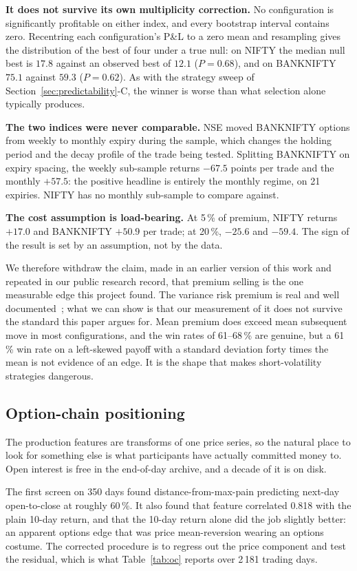 \documentclass[conference]{IEEEtran}
\begin{document}
\textbf{It does not survive its own multiplicity correction.} No configuration
is significantly profitable on either index, and every bootstrap interval
contains zero. Recentring each configuration's P\&L to a zero mean and
resampling gives the distribution of the best of four under a true null: on
NIFTY the median null best is $17.8$ against an observed best of $12.1$
($P = 0.68$), and on BANKNIFTY $75.1$ against $59.3$ ($P = 0.62$). As with the
strategy sweep of Section~\ref{sec:predictability}-C, the winner is worse than
what selection alone typically produces.

\textbf{The two indices were never comparable.} NSE moved BANKNIFTY options from
weekly to monthly expiry during the sample, which changes the holding period and
the decay profile of the trade being tested. Splitting BANKNIFTY on expiry
spacing, the weekly sub-sample returns $-67.5$ points per trade and the monthly
$+57.5$: the positive headline is entirely the monthly regime, on 21 expiries.
NIFTY has no monthly sub-sample to compare against.

\textbf{The cost assumption is load-bearing.} At 5\,\% of premium, NIFTY returns
$+17.0$ and BANKNIFTY $+50.9$ per trade; at 20\,\%, $-25.6$ and $-59.4$. The
sign of the result is set by an assumption, not by the data.

We therefore withdraw the claim, made in an earlier version of this work and
repeated in our public research record, that premium selling is the one
measurable edge this project found. The variance risk premium is real and
well documented~\cite{carr2009,bakshi2003}; what we can show is that our
measurement of it does not survive the standard this paper argues for. Mean
premium does exceed mean subsequent move in most configurations, and the win
rates of 61--68\,\% are genuine, but a 61\,\% win rate on a left-skewed payoff
with a standard deviation forty times the mean is not evidence of an edge. It is
the shape that makes short-volatility strategies dangerous.

\subsection{Option-chain positioning}

The production features are transforms of one price series, so the natural place
to look for something else is what participants have actually committed money
to. Open interest is free in the end-of-day archive, and a decade of it is on
disk.

The first screen on 350 days found distance-from-max-pain predicting next-day
open-to-close at roughly 60\,\%. It also found that feature correlated 0.818
with the plain 10-day return, and that the 10-day return alone did the job
slightly better: an apparent options edge that was price mean-reversion wearing
an options costume. The corrected procedure is to regress out the price
component and test the residual, which is what Table~\ref{tab:oc} reports over
2\,181 trading days.
\end{document}
